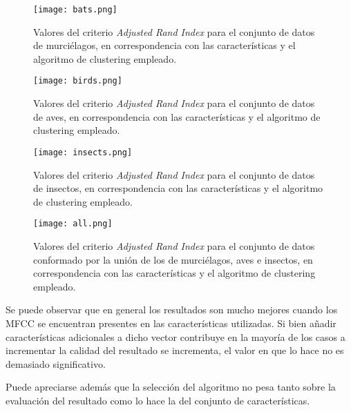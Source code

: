 \begin{figure}[!h]
    \centering
    \texttt{[image: bats.png]}
    \caption{Valores del criterio \textit{Adjusted Rand Index} para el conjunto de datos de murciélagos, en correspondencia con las características y el algoritmo de clustering empleado.}
    \label{img:bats}
\end{figure}

\begin{figure}[!h]
    \centering
    \texttt{[image: birds.png]}
    \caption{Valores del criterio \textit{Adjusted Rand Index} para el conjunto de datos de aves, en correspondencia con las características y el algoritmo de clustering empleado.}
    \label{img:birds}
\end{figure}

\begin{figure}[!h]
    \centering
    \texttt{[image: insects.png]}
    \caption{Valores del criterio \textit{Adjusted Rand Index} para el conjunto de datos de insectos, en correspondencia con las características y el algoritmo de clustering empleado.}
    \label{img:insects}
\end{figure}

\begin{figure}[!h]
    \centering
    \texttt{[image: all.png]}
    \caption{Valores del criterio \textit{Adjusted Rand Index} para el conjunto de datos conformado por la unión de los de murciélagos, aves e insectos, en correspondencia con las características y el algoritmo de clustering empleado.}
    \label{img:all}
\end{figure}

Se puede observar que en general los resultados son mucho mejores cuando los MFCC se encuentran presentes en las características utilizadas.
Si bien añadir características adicionales a dicho vector contribuye en la mayoría de los casos a incrementar la calidad del resultado se incrementa, el valor en que lo hace no es demasiado significativo.

Puede apreciarse además que la selección del algoritmo no pesa tanto sobre la evaluación del resultado como lo hace la del conjunto de características.
